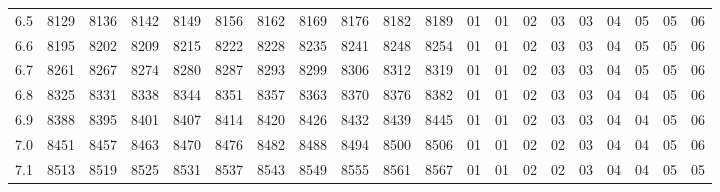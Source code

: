 \documentclass[12pt,UTF8,fontset=none]{ctexbook}
\begin{document}
\begin{appendix}
\begin{longtable}{|c| c c c c c | c c c c c| c c c c c c c c c|}
\scriptsize 6.5 & \scriptsize 8129 & \scriptsize 8136 & \scriptsize 8142 & \scriptsize 8149 & \scriptsize 8156 & \scriptsize 8162 & \scriptsize 8169 & \scriptsize 8176 & \scriptsize 8182 & \scriptsize 8189 & \scriptsize 01 & \scriptsize 01 & \scriptsize 02 & \scriptsize 03 & \scriptsize 03 & \scriptsize 04 & \scriptsize 05 & \scriptsize 05 & \scriptsize 06 \\
\scriptsize 6.6 & \scriptsize 8195 & \scriptsize 8202 & \scriptsize 8209 & \scriptsize 8215 & \scriptsize 8222 & \scriptsize 8228 & \scriptsize 8235 & \scriptsize 8241 & \scriptsize 8248 & \scriptsize 8254 & \scriptsize 01 & \scriptsize 01 & \scriptsize 02 & \scriptsize 03 & \scriptsize 03 & \scriptsize 04 & \scriptsize 05 & \scriptsize 05 & \scriptsize 06 \\
\scriptsize 6.7 & \scriptsize 8261 & \scriptsize 8267 & \scriptsize 8274 & \scriptsize 8280 & \scriptsize 8287 & \scriptsize 8293 & \scriptsize 8299 & \scriptsize 8306 & \scriptsize 8312 & \scriptsize 8319 & \scriptsize 01 & \scriptsize 01 & \scriptsize 02 & \scriptsize 03 & \scriptsize 03 & \scriptsize 04 & \scriptsize 05 & \scriptsize 05 & \scriptsize 06 \\
\scriptsize 6.8 & \scriptsize 8325 & \scriptsize 8331 & \scriptsize 8338 & \scriptsize 8344 & \scriptsize 8351 & \scriptsize 8357 & \scriptsize 8363 & \scriptsize 8370 & \scriptsize 8376 & \scriptsize 8382 & \scriptsize 01 & \scriptsize 01 & \scriptsize 02 & \scriptsize 03 & \scriptsize 03 & \scriptsize 04 & \scriptsize 04 & \scriptsize 05 & \scriptsize 06 \\
\scriptsize 6.9 & \scriptsize 8388 & \scriptsize 8395 & \scriptsize 8401 & \scriptsize 8407 & \scriptsize 8414 & \scriptsize 8420 & \scriptsize 8426 & \scriptsize 8432 & \scriptsize 8439 & \scriptsize 8445 & \scriptsize 01 & \scriptsize 01 & \scriptsize 02 & \scriptsize 03 & \scriptsize 03 & \scriptsize 04 & \scriptsize 04 & \scriptsize 05 & \scriptsize 06 \\
\scriptsize 7.0 & \scriptsize 8451 & \scriptsize 8457 & \scriptsize 8463 & \scriptsize 8470 & \scriptsize 8476 & \scriptsize 8482 & \scriptsize 8488 & \scriptsize 8494 & \scriptsize 8500 & \scriptsize 8506 & \scriptsize 01 & \scriptsize 01 & \scriptsize 02 & \scriptsize 02 & \scriptsize 03 & \scriptsize 04 & \scriptsize 04 & \scriptsize 05 & \scriptsize 06 \\
\scriptsize 7.1 & \scriptsize 8513 & \scriptsize 8519 & \scriptsize 8525 & \scriptsize 8531 & \scriptsize 8537 & \scriptsize 8543 & \scriptsize 8549 & \scriptsize 8555 & \scriptsize 8561 & \scriptsize 8567 & \scriptsize 01 & \scriptsize 01 & \scriptsize 02 & \scriptsize 02 & \scriptsize 03 & \scriptsize 04 & \scriptsize 04 & \scriptsize 05 & \scriptsize 05 \\

\end{longtable}
\end{appendix}
\end{document}
